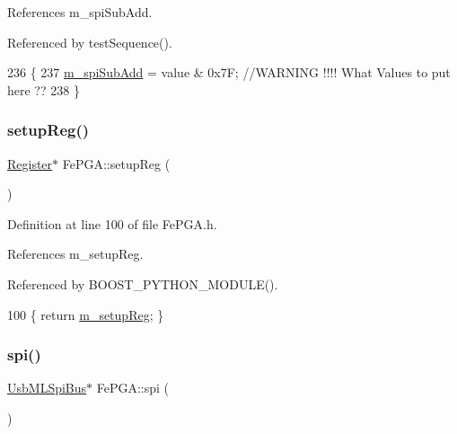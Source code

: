 References m\+\_\+spi\+Sub\+Add.



Referenced by test\+Sequence().


\begin{DoxyCode}
236                                                        \{
237   \hyperlink{classFePGA_a4f2f5d175aeb6dcaf497f81d2f075411}{m\_spiSubAdd} = value & 0x7F;  \textcolor{comment}{//WARNING !!!! What Values to put here ??}
238 \}
\end{DoxyCode}
\mbox{\label{classFePGA_aa0657c6ef809f3f6b54613f237750cc4}} 
\subsubsection{\texorpdfstring{setup\+Reg()}{setupReg()}}
{\footnotesize\ttfamily \hyperlink{classRegister}{Register}$\ast$ Fe\+P\+G\+A\+::setup\+Reg (\begin{DoxyParamCaption}{ }\end{DoxyParamCaption})\hspace{0.3cm}{\ttfamily [inline]}}



Definition at line 100 of file Fe\+P\+G\+A.\+h.



References m\+\_\+setup\+Reg.



Referenced by B\+O\+O\+S\+T\+\_\+\+P\+Y\+T\+H\+O\+N\+\_\+\+M\+O\+D\+U\+L\+E().


\begin{DoxyCode}
100 \{ \textcolor{keywordflow}{return} \hyperlink{classFePGA_a0255fe229013986b4387c3a75ddf4e97}{m\_setupReg};  \}
\end{DoxyCode}
\mbox{\label{classFePGA_ab54f9f61e87f1cced6c4ba19eb38a848}} 
\subsubsection{\texorpdfstring{spi()}{spi()}}
{\footnotesize\ttfamily \hyperlink{classUsbMLSpiBus}{Usb\+M\+L\+Spi\+Bus}$\ast$ Fe\+P\+G\+A\+::spi (\begin{DoxyParamCaption}{ }\end{DoxyParamCaption})\hspace{0.3cm}{\ttfamily [inline]}}



